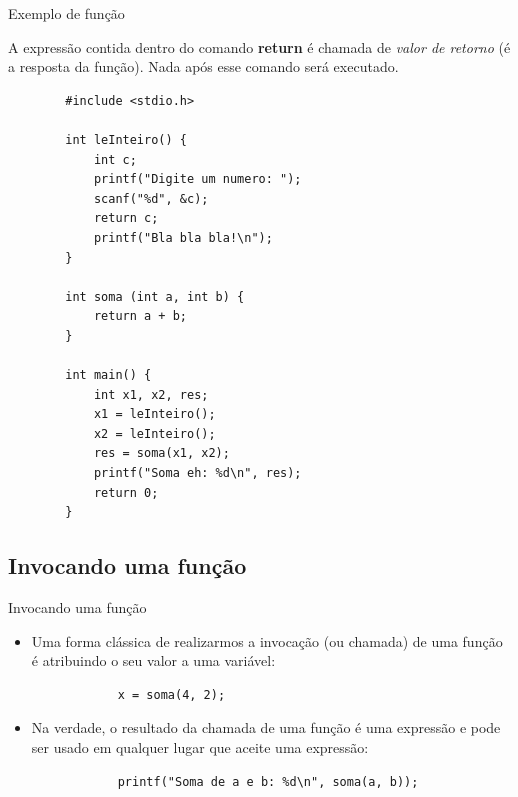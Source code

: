 \documentclass[handout]{beamer}
\begin{document}
\begin{frame}[fragile]{Exemplo de função}

    \small
    A expressão contida dentro do comando {\bf return} é chamada de \textit{valor de retorno} (é a resposta da função).
    Nada após esse comando será executado.

    \begin{verbatim}
        #include <stdio.h>

        int leInteiro() {
            int c;
            printf("Digite um numero: ");
            scanf("%d", &c);
            return c;
            printf("Bla bla bla!\n");
        }

        int soma (int a, int b) {
            return a + b;
        }
        
        int main() {
            int x1, x2, res;
            x1 = leInteiro();
            x2 = leInteiro();
            res = soma(x1, x2);
            printf("Soma eh: %d\n", res);
            return 0;
        }
    \end{verbatim}
\end{frame}


\subsection{Invocando uma função}

\begin{frame}[fragile]{Invocando uma função}

    \begin{itemize}
        \item Uma forma clássica de realizarmos a invocação (ou chamada) de uma função é atribuindo o seu valor a uma variável:
        \begin{verbatim}
            x = soma(4, 2);
        \end{verbatim}

        \pause

        \item Na verdade, o resultado da chamada de uma função é uma expressão e pode ser usado em qualquer lugar que aceite uma expressão:
        \begin{verbatim}
            printf("Soma de a e b: %d\n", soma(a, b));
        \end{verbatim}
    \end{itemize}
\end{frame}
\end{document}
